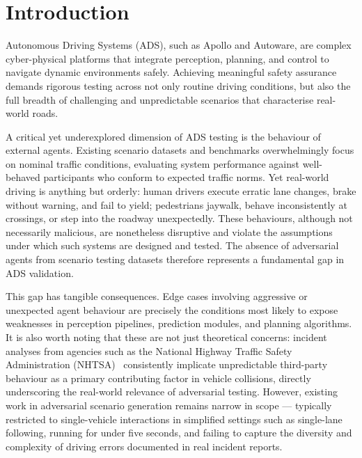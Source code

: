 \documentclass[sigconf,review,anonymous]{acmart}
\begin{document}
\section{Introduction}

Autonomous Driving Systems (ADS), such as Apollo and Autoware, are complex cyber-physical platforms that integrate perception, planning, and control to navigate dynamic environments safely. Achieving meaningful safety assurance demands rigorous testing across not only routine driving conditions, but also the full breadth of challenging and unpredictable scenarios that characterise real-world roads.

A critical yet underexplored dimension of ADS testing is the behaviour of external agents. Existing scenario datasets and benchmarks overwhelmingly focus on nominal traffic conditions, evaluating system performance against well-behaved participants who conform to expected traffic norms. Yet real-world driving is anything but orderly: human drivers execute erratic lane changes, brake without warning, and fail to yield; pedestrians jaywalk, behave inconsistently at crossings, or step into the roadway unexpectedly. These behaviours, although not necessarily malicious, are nonetheless disruptive and violate the assumptions under which such systems are designed and tested. The absence of adversarial agents from scenario testing datasets therefore represents a fundamental gap in ADS validation.

This gap has tangible consequences. Edge cases involving aggressive or unexpected agent behaviour are precisely the conditions most likely to expose weaknesses in perception pipelines, prediction modules, and planning algorithms. It is also worth noting that these are not just theoretical concerns: incident analyses from agencies such as the National Highway Traffic Safety Administration (NHTSA)~\cite{noauthor_pre-crash_nodate} consistently implicate unpredictable third-party behaviour as a primary contributing factor in vehicle collisions, directly underscoring the real-world relevance of adversarial testing. However,  existing work in adversarial scenario generation remains narrow in scope — typically restricted to single-vehicle interactions in simplified settings such as single-lane following, running for under five seconds, and failing to capture the diversity and complexity of driving errors documented in real incident reports.
\end{document}
